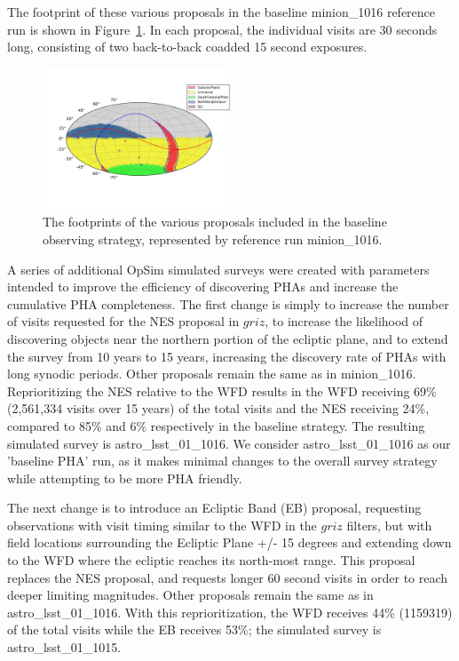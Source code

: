The footprint of these various proposals in the baseline minion\_1016 reference run is shown in Figure~\ref{fig:minion_footprints}. In each proposal, the individual visits are 30 seconds long, consisting of two back-to-back coadded 15 second exposures. 

\begin{figure}
\centering
\includegraphics[width=0.5\textwidth]{figures/minion_1016_proposal_footprint}
\caption{The footprints of the various proposals included in the baseline observing strategy, represented by reference run minion\_1016. 
\label{fig:minion_footprints}}
\end{figure}

A series of additional OpSim simulated surveys were created with parameters intended to improve the efficiency of discovering PHAs and increase the cumulative PHA completeness. The first change is simply to increase the number of visits requested for the NES proposal in $griz$, to increase the likelihood of discovering objects near the northern portion of the ecliptic plane, and to extend the survey from 10 years to 15 years, increasing the discovery rate of PHAs with long synodic periods. Other proposals remain the same as in minion\_1016. Reprioritizing the NES relative to the WFD results in the WFD receiving 69\% (2,561,334 visits over 15 years) of the total visits and the NES receiving 24\%, compared to 85\% and 6\% respectively in the baseline strategy. The resulting simulated survey is astro\_lsst\_01\_1016.  We consider astro\_lsst\_01\_1016 as our 'baseline PHA' run, as it makes minimal changes to the overall survey strategy while attempting to be more PHA friendly. 

The next change is to introduce an Ecliptic Band (EB) proposal, requesting observations with visit timing similar to the WFD in the $griz$ filters, but with field locations surrounding the Ecliptic Plane +/- 15 degrees and extending down to the WFD where the ecliptic reaches its north-most range. This proposal replaces the NES proposal, and requests longer 60 second visits in order to reach deeper limiting magnitudes. Other proposals remain the same as in astro\_lsst\_01\_1016. With this reprioritization, the WFD receives 44\% (1159319) of the total visits while the EB receives 53\%; the simulated survey is astro\_lsst\_01\_1015. 

